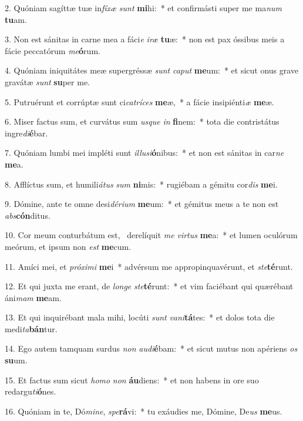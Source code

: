 2. Quóniam sagíttæ tuæ in\textit{fí}\textit{xæ} \textit{sunt} \textbf{mi}hi:~*  et confirmásti super me ma\textit{num} \textbf{tu}am.\

3. Non est sánitas in carne mea a fáci\textit{e} \textit{i}\textit{ræ} \textbf{tu}æ:~*  non est pax óssibus meis a fácie peccatórum \textit{me}\textbf{ó}rum.\

4. Quóniam iniquitátes meæ supergréssæ \textit{sunt} \textit{ca}\textit{put} \textbf{me}um:~*  et sicut onus grave gravátæ \textit{sunt} \textbf{su}per me.\

5. Putruérunt et corrúptæ sunt ci\textit{ca}\textit{trí}\textit{ces} \textbf{me}æ,~*  a fácie insipiénti\textit{æ} \textbf{me}æ.\

6. Miser factus sum, et curvátus sum \textit{us}\textit{que} \textit{in} \textbf{fi}nem:~*  tota die contristátus ingre\textit{di}\textbf{é}bar.\

7. Quóniam lumbi mei impléti sunt \textit{il}\textit{lu}\textit{si}\textbf{ó}nibus:~*  et non est sánitas in car\textit{ne} \textbf{me}a.\

8. Afflíctus sum, et humili\textit{á}\textit{tus} \textit{sum} \textbf{ni}mis:~*  rugiébam a gémitu cor\textit{dis} \textbf{me}i.\

9. Dómine, ante te omne desi\textit{dé}\textit{ri}\textit{um} \textbf{me}um:~*  et gémitus meus a te non est \textit{abs}\textbf{cón}ditus.\

10. Cor meum conturbátum est, \dag\  derelíquit \textit{me} \textit{vir}\textit{tus} \textbf{me}a:~*  et lumen oculórum meórum, et ipsum non \textit{est} \textbf{me}cum.\

11. Amíci mei, et \textit{pró}\textit{xi}\textit{mi} \textbf{me}i~*  advérsum me appropinquavérunt, et \textit{ste}\textbf{té}runt.\

12. Et qui juxta me erant, de \textit{lon}\textit{ge} \textit{ste}\textbf{té}runt:~*  et vim faciébant qui quærébant áni\textit{mam} \textbf{me}am.\

13. Et qui inquirébant mala mihi, locúti \textit{sunt} \textit{va}\textit{ni}\textbf{tá}tes:~*  et dolos tota die medi\textit{ta}\textbf{bán}tur.\

14. Ego autem tamquam surdus \textit{non} \textit{au}\textit{di}\textbf{é}bam:~*  et sicut mutus non apériens \textit{os} \textbf{su}um.\

15. Et factus sum sicut \textit{ho}\textit{mo} \textit{non} \textbf{áu}diens:~*  et non habens in ore suo redargu\textit{ti}\textbf{ó}nes.\

16. Quóniam in te, Dó\textit{mi}\textit{ne}, \textit{spe}\textbf{rá}vi:~*  tu exáudies me, Dómine, De\textit{us} \textbf{me}us.\

